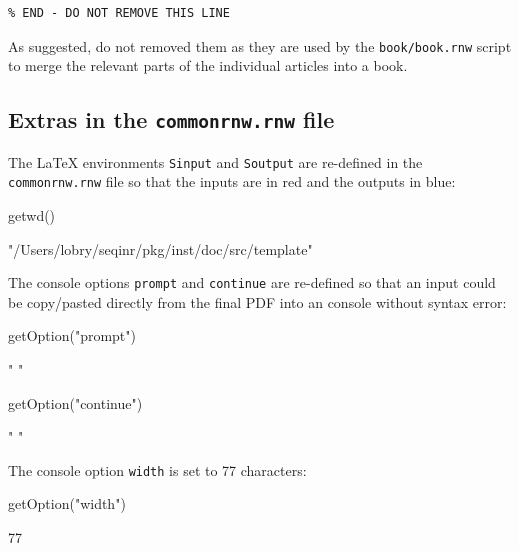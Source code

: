 \documentclass{article}
\begin{document}
\begin{verbatim}
% END - DO NOT REMOVE THIS LINE
\end{verbatim}

As suggested, do not removed them as they are used by the \texttt{book/book.rnw}
script to merge the relevant parts of the individual articles into
a book.

\subsection{Extras in the \texttt{commonrnw.rnw} file}

The \LaTeX{} environments \texttt{Sinput} and \texttt{Soutput}
are re-defined in the \texttt{commonrnw.rnw} file so that the
\Rlogo{} inputs are in red and the \Rlogo{} outputs in blue:

\begin{Schunk}
\begin{Sinput}
 getwd()
\end{Sinput}
\begin{Soutput}
[1] "/Users/lobry/seqinr/pkg/inst/doc/src/template"
\end{Soutput}
\end{Schunk}

The \Rlogo{} console options \texttt{prompt} and \texttt{continue}
are re-defined so that an \Rlogo{} input could be copy/pasted
directly from the final PDF into an \Rlogo{} console without
syntax error:

\begin{Schunk}
\begin{Sinput}
 getOption("prompt")
\end{Sinput}
\begin{Soutput}
[1] " "
\end{Soutput}
\begin{Sinput}
 getOption("continue")
\end{Sinput}
\begin{Soutput}
[1] " "
\end{Soutput}
\end{Schunk}

The \Rlogo{} console option \texttt{width} is set to 77 characters:

\begin{Schunk}
\begin{Sinput}
 getOption("width")
\end{Sinput}
\begin{Soutput}
[1] 77
\end{Soutput}
\end{Schunk}
\end{document}
